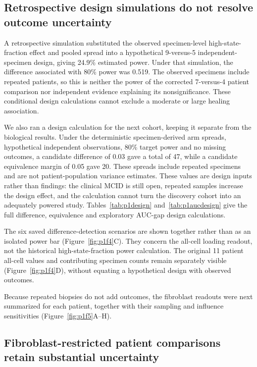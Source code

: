 \documentclass[10pt,a4paper]{article}
\begin{document}
\subsection{Retrospective design simulations do not resolve outcome uncertainty}

A retrospective simulation substituted the observed specimen-level high-state-fraction effect and pooled spread into a hypothetical 9-versus-5 independent-specimen design, giving 24.9\% estimated power. Under that simulation, the difference associated with 80\% power was 0.519. The observed specimens include repeated patients, so this is neither the power of the corrected 7-versus-4 patient comparison nor independent evidence explaining its nonsignificance. These conditional design calculations cannot exclude a moderate or large healing association.

We also ran a design calculation for the next cohort, keeping it separate from the biological results. Under the deterministic specimen-derived arm spreads, hypothetical independent observations, 80\% target power and no missing outcomes, a candidate difference of 0.03 gave a total of 47, while a candidate equivalence margin of 0.05 gave 20. These spreads include repeated specimens and are not patient-population variance estimates. These values are design inputs rather than findings: the clinical MCID is still open, repeated samples increase the design effect, and the calculation cannot turn the discovery cohort into an adequately powered study. Tables~\ref{tab:p1design} and~\ref{tab:p1aucdesign} give the full difference, equivalence and exploratory AUC-gap design calculations.

The six saved difference-detection scenarios are shown together rather than as an isolated power bar (Figure~\ref{fig:p1f4}C). They concern the all-cell loading readout, not the historical high-state-fraction power calculation. The original 11 patient all-cell values and contributing specimen counts remain separately visible (Figure~\ref{fig:p1f4}D), without equating a hypothetical design with observed outcomes.

Because repeated biopsies do not add outcomes, the fibroblast readouts were next summarized for each patient, together with their sampling and influence sensitivities (Figure~\ref{fig:p1f5}A--H\label{call:p1f5}).

\subsection{Fibroblast-restricted patient comparisons retain substantial uncertainty}
\end{document}
